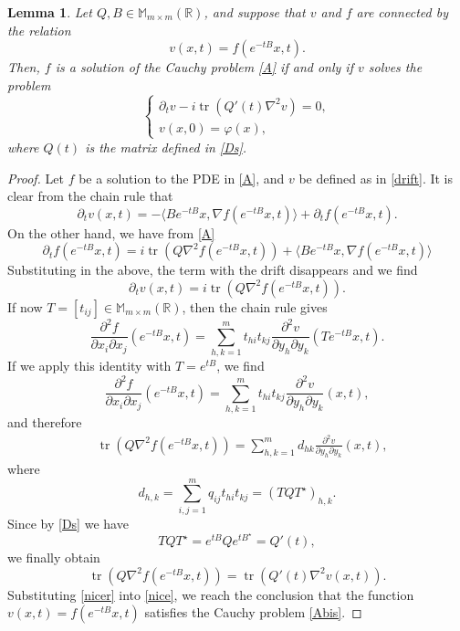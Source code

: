 \documentclass[11pt,a4paper]{amsart}
\def \R {\mathbb{R}}
\def \vf{\varphi}
\newcommand{\p}{\partial}
\numberwithin{equation}{section}
\newtheorem{lemma}[theorem]{Lemma}
\numberwithin{equation}{section}
\begin{document}
\begin{lemma}\label{L:drift}
Let $Q, B\in \mathbb M_{m\times m}(\R)$, and suppose that $v$ and $f$ are connected by the relation
\begin{equation}\label{drift}
v(x,t) = f(e^{- t B} x,t).
\end{equation}
Then, $f$ is a solution of the Cauchy problem \eqref{A} if and only if $v$ solves the problem
\begin{equation}\label{Abis}
\begin{cases}
\p_t v - i \operatorname{tr}(Q'(t) \nabla^2 v) = 0,
\\
v(x,0) = \vf(x),
\end{cases}
\end{equation} 
where $Q(t)$ is the matrix defined in \eqref{Ds}.
\end{lemma}

\begin{proof}
Let $f$ be a solution to the PDE in \eqref{A}, and $v$ be defined as in \eqref{drift}. 
 It is clear from the chain rule that
\[
\p_t  v(x,t) = -   \langle B e^{-  t B}x,\nabla f(e^{-  t B} x,t)\rangle + \p_t  f(e^{- t B} x,t).
\]
On the other hand, we have from \eqref{A}
\[
\p_t  f(e^{- t B} x,t)=  i \operatorname{tr}(Q \nabla^2 f(e^{- t B}x,t)) +  \langle B e^{- t B} x,\nabla f(e^{- t B}x,t)\rangle
\] 
Substituting in the above, the term with the drift disappears and we find
\begin{equation}\label{nice}
\p_t  v(x,t) = i \operatorname{tr}(Q \nabla^2 f(e^{- t B}x,t)).
\end{equation}
If now $T = [t_{ij}] \in \mathbb M_{m\times m}(\mathbb R)$,  then the chain rule gives 
\[
\frac{\p^2 f}{\p x_i\p x_j}(e^{-tB}x,t)   = \sum_{h,k=1}^m t_{hi} t_{kj} \frac{\p^2 v}{\partial y_h\p y_k}(Te^{-tB}x,t).
\] 
If we apply this identity with $T = e^{tB}$, we find
\[
\frac{\p^2 f}{\p x_i\p x_j}(e^{-tB}x,t)   = \sum_{h,k=1}^m t_{hi} t_{kj} \frac{\p^2 v}{\partial y_h\p y_k}(x,t),
\] 
and therefore
\begin{align*}
& \operatorname{tr}(Q \nabla^2 f(e^{- t B}x,t)) = \sum_{h,k=1}^m d_{hk} \frac{\p^2 v}{\partial y_h\p y_k}(x,t),
\end{align*}
where 
\[
d_{h,k} = \sum_{i,j=1}^m q_{ij}t_{hi} t_{kj} = (TQT^\star)_{h,k}.
\]
Since by \eqref{Ds} we have 
\[
TQT^\star = e^{tB} Q e^{tB^\star} = Q'(t),
\]
we finally obtain
\begin{equation}\label{nicer}
\operatorname{tr}(Q \nabla^2 f(e^{- t B}x,t)) = \operatorname{tr}(Q'(t) \nabla^2 v(x,t)).
\end{equation}
Substituting \eqref{nicer} into \eqref{nice}, we reach the conclusion that the function $v(x,t) = f(e^{-tB}x,t)$ satisfies the Cauchy problem \eqref{Abis}.


\end{proof}
\end{document}
